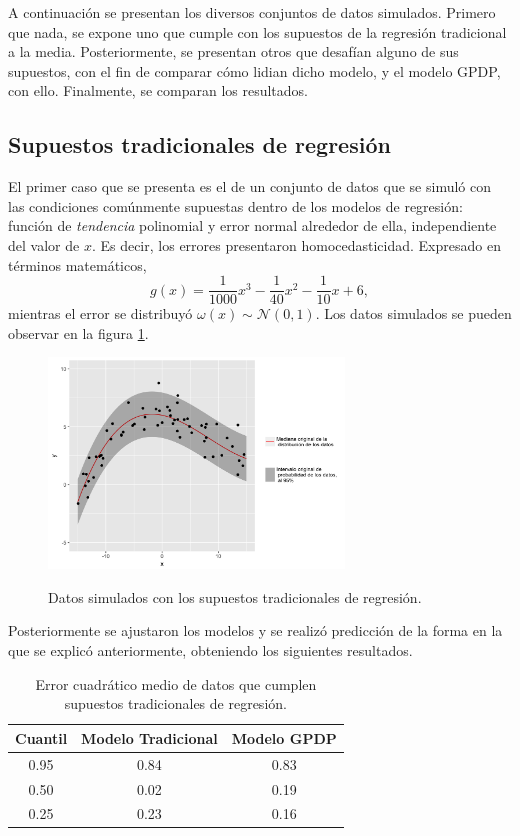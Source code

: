 A continuaci\'on se presentan los diversos conjuntos de datos simulados. Primero que nada, se expone uno que cumple con los supuestos de la regresi\'on tradicional a la media. Posteriormente, se presentan otros que desaf\'ian alguno de sus supuestos, con el fin de comparar c\'omo lidian dicho modelo, y el modelo GPDP, con ello. Finalmente, se comparan los resultados.

\subsection{Supuestos tradicionales de regresi\'on}

El primer caso que se presenta es el de un conjunto de datos que se simul\'o con las condiciones com\'unmente supuestas dentro de los modelos de regresi\'on: funci\'on de \textit{tendencia} polinomial y error normal alrededor de ella, independiente del valor de $x$. Es decir, los errores presentaron homocedasticidad. Expresado en t\'erminos matem\'aticos,
\begin{equation*}
    g(x) = \frac{1}{1000}x^3 - \frac{1}{40}x^2 - \frac{1}{10}x + 6,
\end{equation*}
mientras el error se distribuy\'o $\omega(x) \sim \mathcal{N}(0,1)$. Los datos simulados se pueden observar en la figura \ref{sample_classic}.

\begin{figure}[H]
	\centering
	\caption{Datos simulados con los supuestos tradicionales de regresi\'on.}
	\includegraphics[width=0.7\textwidth]{Figures/Simulation/classic/sample.png}
	\label{sample_classic}
\end{figure}

Posteriormente se ajustaron los modelos y se realiz\'o predicci\'on de la forma en la que se explic\'o anteriormente, obteniendo los siguientes resultados.

\begin{table}[H]
\centering
\caption{Error cuadrático medio de datos que cumplen supuestos tradicionales de regresi\'on.} 
\begin{tabular}{ccc}
  \hline
Cuantil & Modelo Tradicional & Modelo GPDP \\ 
  \hline
0.95 & 0.84 & 0.83 \\ 
  0.50 & 0.02 & 0.19 \\ 
  0.25 & 0.23 & 0.16 \\ 
   \hline
\end{tabular}
\label{mse_classic}
\end{table}

